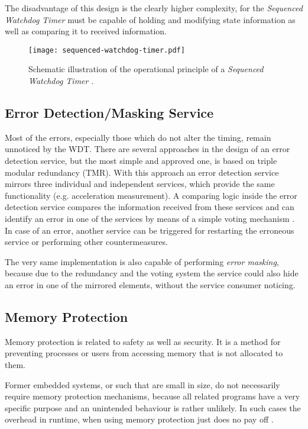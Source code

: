 \begin{description}
The disadvantage of this design is the clearly higher complexity, for the \emph{Sequenced Watchdog Timer} must be capable of holding and modifying state information as well as comparing it to received information.

\begin{figure}[!htbp]
\centering
\texttt{[image: sequenced-watchdog-timer.pdf]}
\caption{Schematic illustration of the operational principle of a \emph{Sequenced Watchdog Timer} \cite{elattar2007}.}
\label{fig:sequenced-watchdog-timer}
\end{figure}

\end{description}






\subsection{Error Detection/Masking Service}
\label{sec:error-detection-service}

Most of the errors, especially those which do not alter the timing, remain unnoticed by the WDT. There are several approaches in the design of an error detection service, but the most simple and approved one, is based on triple modular redundancy (TMR). With this approach an error detection service mirrors three individual and independent services, which provide the same functionality (e.g. acceleration measurement). A comparing logic inside the error detection service compares the information received from these services and can identify an error in one of the services by means of a simple voting mechanism \cite{wiki_tmr}. In case of an error, another service can be triggered for restarting the erroneous service or performing other countermeasures.

The very same implementation is also capable of performing \emph{error masking}, because due to the redundancy and the voting system the service could also hide an error in one of the mirrored elements, without the service consumer noticing.


\subsection{Memory Protection}
Memory protection is related to safety as well as security. It is a method for preventing processes or users from accessing memory that is not allocated to them.

Former embedded systems, or such that are small in size, do not necessarily require memory protection mechanisms, because all related programs have a very specific purpose and an unintended behaviour is rather unlikely. In such cases the overhead in runtime, when using memory protection just does no pay off \cite{yamada2008}. 

